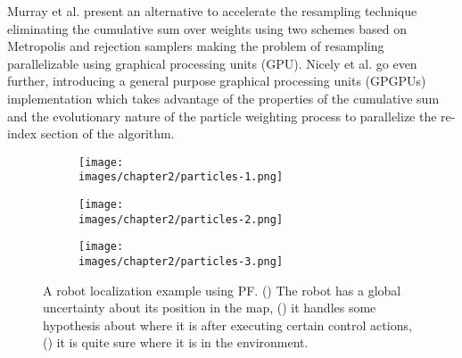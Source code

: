 Murray et al. present an alternative to accelerate the resampling technique eliminating the cumulative sum over weights using two schemes based on Metropolis\cite{Metropolis:fast-computing} and rejection samplers making the problem of resampling parallelizable using graphical processing units (GPU)\cite{Murray:parallel-res}. Nicely et al. go even further, introducing a general purpose graphical processing units (GPGPUs) implementation which takes advantage of the properties of the cumulative sum and the evolutionary nature of the particle weighting process to parallelize the re-index section of the algorithm\cite{Nicely:improvised-parallel-res}.


\begin{figure}[h!]
  \centering
  \begin{subfigure}[b]{0.65\linewidth}
  	\texttt{[image: \\images/chapter2/particles-1.png]}
	\caption{}
  	\label{fig:ch-2:particles-1}
  \end{subfigure}
  \begin{subfigure}[b]{0.47\linewidth}
  	\texttt{[image: \\images/chapter2/particles-2.png]}
	\caption{}
  	\label{fig:ch-2:particles-2}
  \end{subfigure}
  \vspace{0.00mm}
  \begin{subfigure}[b]{0.47\linewidth}
  	\texttt{[image: \\images/chapter2/particles-3.png]}
	\caption{}
  	\label{fig:ch-2:particles-3}
  \end{subfigure}
  \vspace{0.00mm}
  \caption[A robot localization example using PF.]{A robot localization example using PF. () The robot has a global uncertainty about its position in the map, () it handles some hypothesis about where it is after executing certain control actions, () it is quite sure where it is in the environment.}
  \label{fig:ch-2:particles-ex}
\end{figure}


